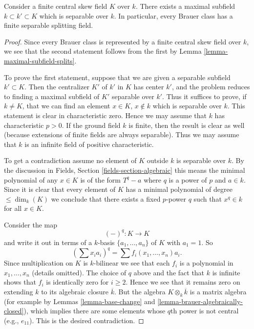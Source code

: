 \begin{proposition}
\label{proposition-separable-splitting-field}
Consider a finite central skew field $K$ over $k$.
There exists a maximal subfield $k \subset k' \subset K$ which
is separable over $k$.
In particular, every Brauer class has a finite separable
splitting field.
\end{proposition}

\begin{proof}
Since every Brauer class is represented by a finite central skew
field over $k$, we see that the second statement follows from the
first by
Lemma \ref{lemma-maximal-subfield-splits}.

\medskip\noindent
To prove the first statement, suppose that we are given a separable
subfield $k' \subset K$. Then the centralizer $K'$ of $k'$ in $K$
has center $k'$, and the problem reduces to finding a maximal
subfield of $K'$ separable over $k'$. Thus it suffices to prove, if
$k \not = K$, that we can find an element $x \in K$, $x \not \in k$
which is separable over $k$. This statement is clear in characteristic
zero. Hence we may assume that $k$ has characteristic $p > 0$. If the
ground field $k$ is finite, then the result is clear as well (because
extensions of finite fields are always separable). Thus we may assume
that $k$ is an infinite field of positive characteristic.

\medskip\noindent
To get a contradiction assume no element of $K$ outside $k$ is separable over $k$.
By the discussion in
Fields, Section \ref{fields-section-algebraic}
this means the minimal polynomial of any $x \in K$ is of the form
$T^q - a$ where $q$ is a power of $p$ and $a \in k$. Since it is
clear that every element of $K$ has a minimal polynomial of degree
$\leq \dim_k(K)$ we conclude that there exists a fixed $p$-power
$q$ such that $x^q \in k$ for all $x \in K$.

\medskip\noindent
Consider the map
$$
(-)^q : K \longrightarrow K
$$
and write it out in terms of a $k$-basis $\{a_1, \ldots, a_n\}$ of $K$
with $a_1 = 1$. So
$$
(\sum x_i a_i)^q = \sum f_i(x_1, \ldots, x_n)a_i.
$$
Since multiplication on $K$ is $k$-bilinear we see that each $f_i$
is a polynomial in $x_1, \ldots, x_n$ (details omitted).
The choice of $q$ above and the fact that $k$ is infinite shows that
$f_i$ is identically zero for $i \geq 2$. Hence we see that it remains
zero on extending $k$ to its algebraic closure $\overline{k}$. But the
algebra $K \otimes_k \overline{k}$ is a matrix algebra (for example by
Lemmas \ref{lemma-base-change} and \ref{lemma-brauer-algebraically-closed}),
which implies there are some elements whose $q$th power is not central
(e.g., $e_{11}$). This is the desired contradiction.
\end{proof}

